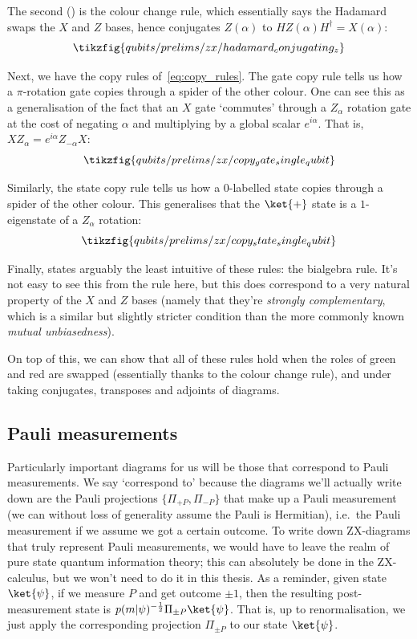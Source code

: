 The second () is the colour change rule, which essentially says the Hadamard swaps the $X$ and $Z$ bases, hence conjugates $Z(\alpha)$ to $HZ(\alpha)H^\dagger = X(\alpha)$:
\begin{equation}
    \tikzfig{qubits/prelims/zx/hadamard_conjugating_z}
\end{equation}

Next, we have the copy rules of~\eqref{eq:copy_rules}.
The gate copy rule tells us how a $\pi$-rotation gate copies through a spider of the other colour.
One can see this as a generalisation of the fact that an $X$ gate `commutes' through a $Z_{\alpha}$ rotation gate at the cost of negating $\alpha$ and multiplying by a global scalar $e^{i\alpha}$.
That is, $X Z_{\alpha} = e^{i\alpha} Z_{-\alpha} X$:
\begin{equation}
    \tikzfig{qubits/prelims/zx/copy_gate_single_qubit}
\end{equation}

Similarly, the state copy rule tells us how a $0$-labelled state copies through a spider of the other colour.
This generalises that the $\ket{+}$ state is a $1$-eigenstate of a $Z_{\alpha}$ rotation:
\begin{equation}
    \tikzfig{qubits/prelims/zx/copy_state_single_qubit}
\end{equation}

Finally,  states arguably the least intuitive of these rules: the bialgebra rule.
It's not easy to see this from the rule here, but this does correspond to a very natural property of the $X$ and $Z$ bases (namely that they're \textit{strongly complementary}, which is a similar but slightly stricter condition than the more commonly known \textit{mutual unbiasedness}).

On top of this, we can show that all of these rules hold when the roles of green and red are swapped (essentially thanks to the colour change rule), and under taking conjugates, transposes and adjoints of diagrams.

\subsection{Pauli measurements}\label{subsec:qubit_pauli_measurements}

Particularly important diagrams for us will be those that correspond to Pauli measurements.
We say `correspond to' because the diagrams we'll actually write down are the Pauli projections $\{\Pi_{+P}, \Pi_{-P}\}$ that make up a Pauli measurement (we can without loss of generality assume the Pauli is Hermitian), i.e.\ the Pauli measurement if we assume we got a certain outcome.
To write down ZX-diagrams that truly represent Pauli measurements, we would have to leave the realm of pure state quantum information theory; this can absolutely be done in the ZX-calculus, but we won't need to do it in this thesis.
As a reminder, given state $\ket{\psi}$, if we measure $P$ and get outcome $\pm 1$, then the resulting post-measurement state is $p(m | \psi)^{-\frac{1}{2}} \Pi_{\pm P} \ket{\psi}$.
That is, up to renormalisation, we just apply the corresponding projection $\Pi_{\pm P}$ to our state $\ket{\psi}$.

